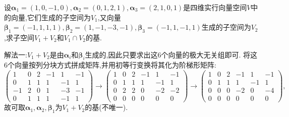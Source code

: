 \documentclass[lang=cn,newtx,10pt,scheme=chinese]{elegantbook}
\begin{document}
    \begin{exercise}
    设\(\boldsymbol{\alpha}_1=(1,0, - 1,0),\boldsymbol{\alpha}_2=(0,1,2,1),\boldsymbol{\alpha}_3=(2,1,0,1)\)是四维实行向量空间\(V\)中的向量,它们生成的子空间为\(V_1\),又向量\(\boldsymbol{\beta}_1=(-1,1,1,1),\boldsymbol{\beta}_2=(1,-1,-3,-1),\boldsymbol{\beta}_3=(-1,1,-1,1)\)生成的子空间为\(V_2\),求子空间\(V_1 + V_2\)和\(V_1\cap V_2\)的基.
    \end{exercise}
    \begin{solution}
        {\color{blue}解法一:}\(V_1 + V_2\)是由\(\boldsymbol{\alpha}_i\)和\(\boldsymbol{\beta}_i\)生成的,因此只要求出这6个向量的极大无关组即可. 将这6个向量按列分块方式拼成矩阵,并用初等行变换将其化为阶梯形矩阵:
    \[
    \begin{pmatrix}
    1&0&2&-1&1&-1\\
    0&1&1&1&-1&1\\
    -1&2&0&1&-3&-1\\
    0&1&1&1&-1&1
    \end{pmatrix}\to
    \begin{pmatrix}
    1&0&2&-1&1&-1\\
    0&1&1&1&-1&1\\
    0&2&2&0&-2&-2\\
    0&0&0&0&0&0
    \end{pmatrix}\to
    \begin{pmatrix}
    1&0&2&-1&1&-1\\
    0&1&1&1&-1&1\\
    0&0&0&-2&0&-4\\
    0&0&0&0&0&0
    \end{pmatrix},
    \]
    故可取\(\boldsymbol{\alpha}_1,\boldsymbol{\alpha}_2,\boldsymbol{\beta}_1\)为\(V_1 + V_2\)的基(不唯一).
    

\end{solution}
\end{document}
